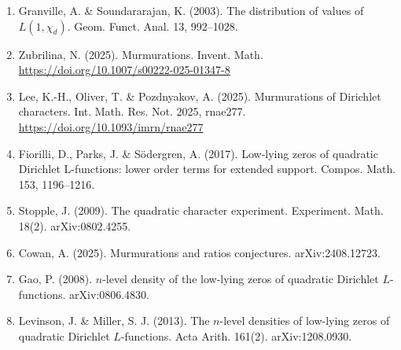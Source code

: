 \documentclass[
  10pt,
]{article}
\begin{document}
\begin{enumerate}
  \url{https://pari.math.u-bordeaux.fr/}
\item
  Granville, A. \& Soundararajan, K. (2003). The distribution of values
  of \(L(1, \chi_d)\). Geom. Funct. Anal. 13, 992--1028.
\item
  Zubrilina, N. (2025). Murmurations. Invent. Math.
  \url{https://doi.org/10.1007/s00222-025-01347-8}
\item
  Lee, K.-H., Oliver, T. \& Pozdnyakov, A. (2025). Murmurations of
  Dirichlet characters. Int. Math. Res. Not. 2025, rnae277.
  \url{https://doi.org/10.1093/imrn/rnae277}
\item
  Fiorilli, D., Parks, J. \& Södergren, A. (2017). Low-lying zeros of
  quadratic Dirichlet L-functions: lower order terms for extended
  support. Compos. Math. 153, 1196--1216.
\item
  Stopple, J. (2009). The quadratic character experiment. Experiment.
  Math. 18(2). arXiv:0802.4255.
\item
  Cowan, A. (2025). Murmurations and ratios conjectures.
  arXiv:2408.12723.
\item
  Gao, P. (2008). \(n\)-level density of the low-lying zeros of
  quadratic Dirichlet \(L\)-functions. arXiv:0806.4830.
\item
  Levinson, J. \& Miller, S. J. (2013). The \(n\)-level densities of
  low-lying zeros of quadratic Dirichlet \(L\)-functions. Acta Arith.
  161(2). arXiv:1208.0930.
\end{enumerate}
\end{document}
